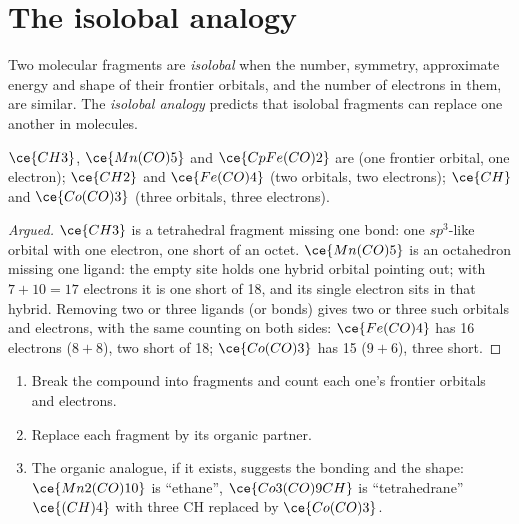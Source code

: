 \section{The isolobal analogy}

\begin{definition}\label{def:b3:organometallic-bonding:isolobal}
Two molecular fragments are \emph{isolobal} when the
number, symmetry, approximate energy and shape of their frontier orbitals, and the
number of electrons in them, are similar. The \emph{isolobal
analogy} predicts that isolobal fragments can replace one
another in molecules.
\end{definition}

\begin{proposition}\label{prop:b3:organometallic-bonding:isolobal}
$\ce{CH3}$, $\ce{Mn(CO)5}$ and $\ce{CpFe(CO)2}$ are  (one frontier orbital, one electron);
$\ce{CH2}$ and $\ce{Fe(CO)4}$ (two orbitals, two electrons); $\ce{CH}$ and $\ce{Co(CO)3}$ (three orbitals,
three electrons).
\end{proposition}

\begin{proof}[Argued]
$\ce{CH3}$ is a tetrahedral fragment missing one bond: one $sp^3$-like orbital with one
electron, one short of an octet. $\ce{Mn(CO)5}$ is an octahedron missing one ligand: the
empty site holds one hybrid orbital pointing out; with $7 + 10 = 17$ electrons it is one
short of 18, and its single electron sits in that hybrid. Removing two or three
ligands (or bonds) gives two or three such orbitals and electrons, with the
same counting on both sides: $\ce{Fe(CO)4}$ has 16 electrons ($8 + 8$), two short of 18;
$\ce{Co(CO)3}$ has 15 ($9 + 6$), three short.
\end{proof}

\begin{method}\label{met:b3:organometallic-bonding:isolobal}
\begin{enumerate}
  \item Break the compound into fragments and count each one's frontier orbitals
        and electrons.
  \item Replace each fragment by its organic  partner.
  \item The organic analogue, if it exists, suggests the bonding and the shape:
        $\ce{Mn2(CO)10}$ is ``ethane'', $\ce{Co3(CO)9CH}$ is ``tetrahedrane'' $\ce{(CH)4}$ with three CH
        replaced by $\ce{Co(CO)3}$.
\end{enumerate}
\end{method}

